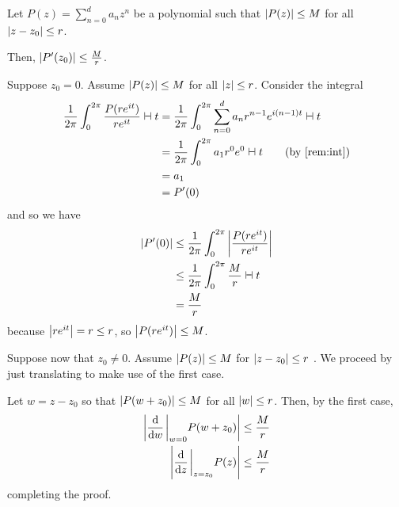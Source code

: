 \documentclass[class=pmath370,tikz,notes]{agony}
\begin{document}
\begin{prop}\label{prop:cest}
  Let $P(z) = \sum_{n=0}^d a_n z^n$
  be a polynomial such that $\abs{P(z)} \leq M$ for all $\abs{z-z_0} \leq r$.

  Then, $\abs{P'(z_0)} \leq \frac{M}{r}$.
\end{prop}
\begin{prf}
  Suppose $z_0 = 0$.
  Assume $\abs{P(z)} \leq M$ for all $\abs{z} \leq r$.
  Consider the integral
  \begin{align*}
    \frac1{2\pi}\int_0^{2\pi}\frac{P(re^{it})}{re^{it}} \dd{t}
     & = \frac1{2\pi}\int_0^{2\pi}\sum_{n=0}^d a_nr^{n-1}e^{i(n-1)t} \dd{t}     \\
     & = \frac1{2\pi}\int_0^{2\pi} a_1 r^0 e^{0} \dd{t} \tag{by \cref{rem:int}} \\
     & = a_1                                                                    \\
     & = P'(0)
  \end{align*}
  and so we have
  \begin{align*}
    \abs{P'(0)} & \leq \frac{1}{2\pi}\int_0^{2\pi}\abs{\frac{P(re^{it})}{re^{it}}} \\
                & \leq \frac{1}{2\pi} \int_0^{2\pi} \frac{M}{r} \dd{t}             \\
                & = \frac{M}{r}
  \end{align*}
  because $\abs{re^{it}} = r \leq r$, so $\abs{P(re^{it})} \leq M$.

  Suppose now that $z_0 \neq 0$.
  Assume $\abs{P(z)} \leq M$ for $\abs{z-z_0} \leq r$ .
  We proceed by just translating to make use of the first case.

  Let $w = z - z_0$ so that $\abs{P(w + z_0)} \leq M$ for all $\abs{w} \leq r$.
  Then, by the first case,
  \begin{align*}
    \abs{\dv{w}\eval_{w=0} P(w + z_0)} & \leq \frac{M}{r} \\
    \abs{\dv{z}\eval_{z=z_0}{P(z)}}    & \leq \frac{M}{r}
  \end{align*}
  completing the proof.
\end{prf}
\end{document}

